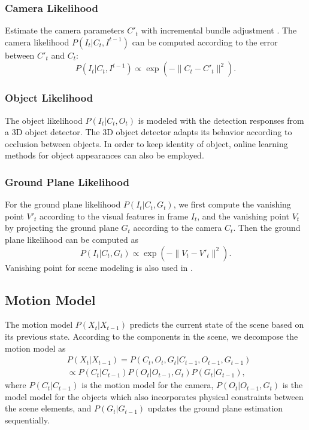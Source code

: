 \documentclass[10pt,column,letterpaper]{article}
\begin{document}
\subsubsection{Camera Likelihood}

Estimate the camera parameters $C'_t$ with incremental bundle adjustment \cite{snavely2008modeling}. The camera likelihood $P(I_t | C_t, I^{t-1})$ can be computed according to the error between $C'_t$ and $C_t$:
\begin{equation}\label{camera}
    P(I_t | C_t, I^{t-1}) \propto \exp(-\| C_t - C'_t \|^2).
\end{equation}

\subsubsection{Object Likelihood}

The object likelihood $P(I_t | C_t, O_t)$ is modeled with the detection responses from a 3D object detector. The 3D object detector adapts its behavior according to occlusion between objects. In order to keep identity of object, online learning methods for object appearances can also be employed.

\subsubsection{Ground Plane Likelihood}

For the ground plane likelihood $P(I_t | C_t, G_t)$, we first compute the vanishing point $V'_t$ according to the visual features in frame $I_t$, and the vanishing point $V_t$ by projecting the ground plane $G_t$ according to the camera $C_t$. Then the ground plane likelihood can be computed as
\begin{equation}\label{ground}
    P(I_t | C_t, G_t) \propto \exp(-\| V_t - V'_t \|^2).
\end{equation}
Vanishing point for scene modeling is also used in \cite{geiger2011joint}.

\subsection{Motion Model}

The motion model $P(X_t | X_{t-1})$ predicts the current state of the scene based on its previous state. According to the components in the scene, we decompose the motion model as
\begin{align}\label{eq:motion}
& P(X_t | X_{t-1}) = P(C_t, O_t, G_t | C_{t-1}, O_{t-1}, G_{t-1}) \nonumber \\
& \propto P(C_t | C_{t-1}) P(O_t | O_{t-1}, G_t) P(G_t | G_{t-1}), 
\end{align}
where $P(C_t | C_{t-1})$ is the motion model for the camera, $P(O_t | O_{t-1}, G_t)$ is the model model for the objects which also incorporates physical constraints between the scene elements, and $P(G_t | G_{t-1})$ updates the ground plane estimation sequentially.
\end{document}
